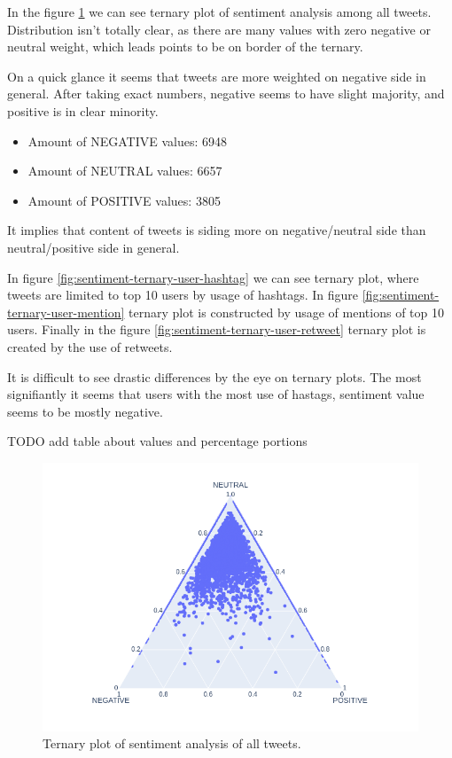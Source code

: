\documentclass[conference]{IEEEtran}
\begin{document}
In the figure \ref{fig:sentiment-ternary-all} we can see ternary plot of sentiment analysis among all tweets.
Distribution isn't totally clear, as there are many values with zero negative or neutral weight, which leads points to be on border of the ternary.

On a quick glance it seems that tweets are more weighted on negative side in general.
After taking exact numbers, negative seems to have slight majority, and positive is in clear minority.

\begin{itemize}
    \item Amount of NEGATIVE values: 6948
    \item Amount of NEUTRAL values: 6657
    \item Amount of POSITIVE values: 3805
\end{itemize}

It implies that content of tweets is siding more on negative/neutral side than neutral/positive side in general.

In figure \ref{fig:sentiment-ternary-user-hashtag} we can see ternary plot, where tweets are limited to top 10 users by usage of hashtags.
In figure \ref{fig:sentiment-ternary-user-mention} ternary plot is constructed by usage of mentions of top 10 users.
Finally in the figure \ref{fig:sentiment-ternary-user-retweet} ternary plot is created by the use of retweets.

It is difficult to see drastic differences by the eye on ternary plots. The most signifiantly it seems that users with the most use
of hastags, sentiment value seems to be mostly negative.

TODO add table about values and percentage portions

\begin{figure}
\includegraphics[scale=0.4]{figures/sentiment_ternary_all}
\caption{Ternary plot of sentiment analysis of all tweets.}
\label{fig:sentiment-ternary-all}
\end{figure}
\end{document}
